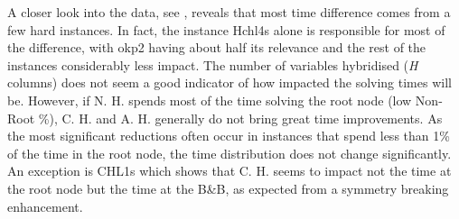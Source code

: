 \documentclass[ppgc,tese,english,formais,babel]{iiufrgs}
\begin{document}
A closer look into the data, see , reveals that most time difference comes from a few hard instances.
In fact, the instance Hchl4s alone is responsible for most of the difference, with okp2 having about half its relevance and the rest of the instances considerably less impact.
The number of variables hybridised (\emph{H} columns) does not seem a good indicator of how impacted the solving times will be.
However, if N. H. spends most of the time solving the root node (low Non-Root \%), C. H. and A. H. generally do not bring great time improvements.
As the most significant reductions often occur in instances that spend less than 1\% of the time in the root node, the time distribution does not change significantly.
An exception is CHL1s which shows that C. H. seems to impact not the time at the root node but the time at the B\&B, as expected from a symmetry breaking enhancement.
\end{document}
